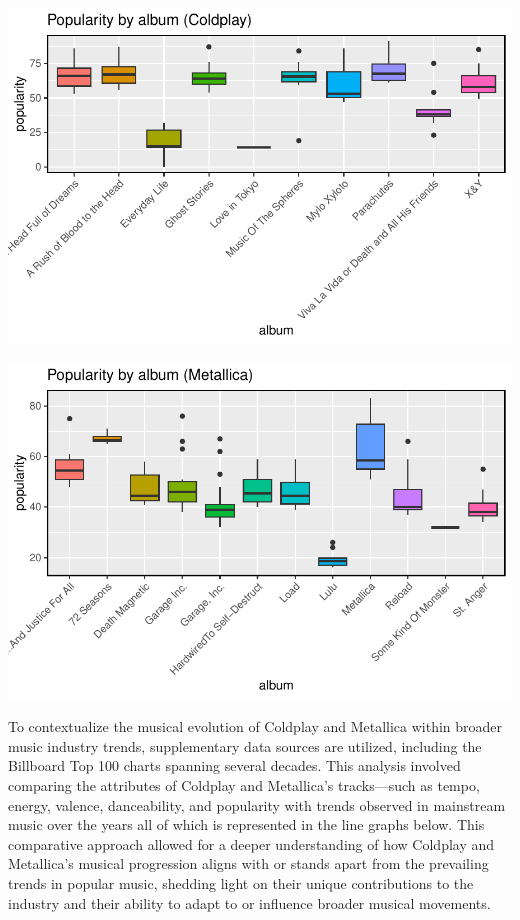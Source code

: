 \documentclass[11pt,preprint, authoryear]{elsarticle}
\let\origfigure\figure
\let\endorigfigure\endfigure
\renewenvironment{figure}[1][2] {
    \expandafter\origfigure\expandafter[H]
} {
    \endorigfigure
}
\numberwithin{equation}{section}
\numberwithin{figure}{section}
\numberwithin{table}{section}
\begin{document}
\begin{figure}[H]

{\centering \includegraphics{Question2_files/figure-latex/Figure1-1} 

}

\caption{Coldplay Album Popularity \label{Figure1}}\label{fig:Figure1}
\end{figure}

\begin{figure}[H]

{\centering \includegraphics{Question2_files/figure-latex/Figure2-1} 

}

\caption{Metallica Album Popularity \label{Figure2}}\label{fig:Figure2}
\end{figure}

To contextualize the musical evolution of Coldplay and Metallica within
broader music industry trends, supplementary data sources are utilized,
including the Billboard Top 100 charts spanning several decades. This
analysis involved comparing the attributes of Coldplay and Metallica's
tracks---such as tempo, energy, valence, danceability, and popularity
with trends observed in mainstream music over the years all of which is
represented in the line graphs below. This comparative approach allowed
for a deeper understanding of how Coldplay and Metallica's musical
progression aligns with or stands apart from the prevailing trends in
popular music, shedding light on their unique contributions to the
industry and their ability to adapt to or influence broader musical
movements.
\end{document}

